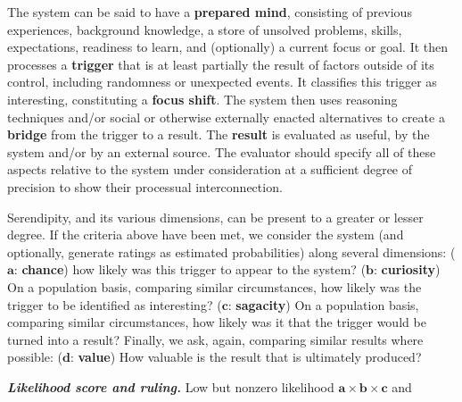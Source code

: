 
\begin{description}[itemsep=16pt]
\item[{(\textbf{A - Definitional characteristics})}] {The system can
  be said to have a {\textbf{prepared mind}}, consisting of previous
  experiences, background knowledge, a store of unsolved problems,
  skills, expectations, readiness to learn, and (optionally) a current
  focus or goal.  It then processes a {\textbf{trigger}} that is at
  least partially the result of factors outside of its control,
  including randomness or unexpected events.  It classifies this
  trigger as interesting, constituting a {\textbf{focus shift}}.  The
  system then uses reasoning techniques and/or social or otherwise
  externally enacted alternatives to create a {\textbf{bridge}} from
  the trigger to a result.  The {\textbf{result}} is evaluated as
  useful, by the system and/or by an external source.}  The evaluator
  should specify all of these aspects relative to the system under
  consideration at a sufficient degree of precision to show their
  processual interconnection.
\item[{(\textbf{B - Dimensions})}] {Serendipity, and its various
  dimensions, can be present to a greater or lesser degree.  If the
  criteria above have been met, we consider the system (and
  optionally, generate ratings as estimated probabilities) along
  several dimensions:
%
{($\mathbf{a}$: \textbf{chance})} how likely was this trigger to appear to
  the system?
%
{($\mathbf{b}$: \textbf{curiosity})} On a population basis, comparing
similar circumstances, how likely was the trigger to be identified as
interesting?
%
{($\mathbf{c}$: \textbf{sagacity})} On a population basis, comparing
similar circumstances, how likely was it that the trigger would be
turned into a result?
%
Finally, we ask, again, comparing similar results where possible:
{($\mathbf{d}$: \textbf{value})} How valuable is the result that
is ultimately produced?}
%
\begin{mdframed}
\vspace{.1cm} {\textbf{\emph{Likelihood score and ruling.}} Low but
  nonzero likelihood $\mathbf{a}\times\mathbf{b}\times\mathbf{c}$ and
}
\end{mdframed}
\end{description}
